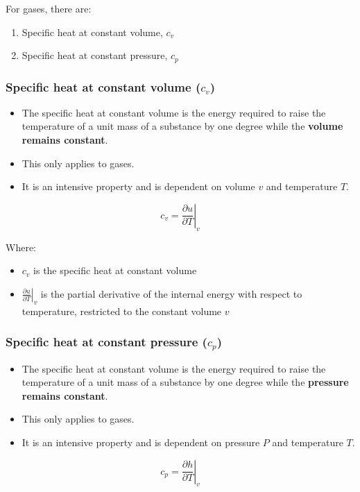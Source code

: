 \documentclass[11pt]{article}
\begin{document}
For gases, there are:
\begin{enumerate}
\item Specific heat at constant volume, \(c_v\)
\item Specific heat at constant pressure, \(c_p\)
\end{enumerate}

\newpage
\subsubsection{Specific heat at constant volume (\(c_v\))}
\label{sec:orgeaceda7}
\begin{itemize}
\item The specific heat at constant volume is the energy required to raise the temperature of a unit mass of a substance by one degree while the \textbf{volume remains constant}.
\item This only applies to gases.
\item It is an intensive property and is dependent on volume \(v\) and temperature \(T\).
\end{itemize}

\[c_v = \left. \frac{\partial u}{\partial T} \right|_v\]

Where:
\begin{itemize}
\item \(c_v\) is the specific heat at constant volume
\item \(\left. \frac{\partial u}{\partial T} \right|_v\) is the partial derivative of the internal energy with respect to temperature, restricted to the constant volume \(v\)
\end{itemize}
\subsubsection{Specific heat at constant pressure (\(c_p\))}
\label{sec:org0dcd445}
\begin{itemize}
\item The specific heat at constant volume is the energy required to raise the temperature of a unit mass of a substance by one degree while the \textbf{pressure remains constant}.
\item This only applies to gases.
\item It is an intensive property and is dependent on pressure \(P\) and temperature \(T\).
\end{itemize}

\[c_p = \left. \frac{\partial h}{\partial T} \right|_v\]
\end{document}
